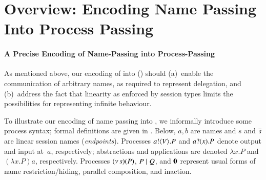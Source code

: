 \documentclass[preprint,11pt]{elsarticle}
\begin{document}
{%

\section{Overview: Encoding Name Passing Into Process Passing}
\label{sec:overview}
%
\paragraph{A Precise Encoding of Name-Passing into Process-Passing}
As mentioned above, 
our encoding of \HOp into \HO () should 
(a)~enable the communication of arbitrary names, as required to represent delegation,
and 
(b)~address the fact that linearity as enforced by session types limits the 
possibilities for representing infinite behaviour. 

To illustrate our encoding of name passing into \HO, we informally introduce some process syntax; formal definitions are given in .
Below, 
$a,b$ are names and $s$ and $\overline{s}$ are 
linear session names (\emph{endpoints}).
Processes $a ! \langle V \rangle . P$ and 
$a ? (x) . P$ denote output and input at~$a$, respectively;   
abstractions and applications are denoted
$\lambda x.P$ and $(\lambda x.P)a$, respectively. 
Processes %
$(\nu\, s)(P)$, $P \;|\; Q$, and $\mathbf{0}$ represent usual forms of name restriction/hiding, parallel composition, and inaction. 

}
\end{document}
